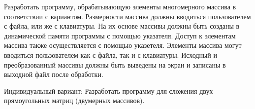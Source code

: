 Разработать программу, обрабатывающую элементы многомерного
массива в соответствии с вариантом.
Размерности массива должны вводиться пользователем с файла, или же
с клавиатуры.
На их основе массивы должны быть созданы в динамической
памяти программы с помощью указателя.
Доступ к элементам массива также осуществляется с помощью указетеля.
Элементы массива могут вводиться пользователем как с файла, так и с
клавиатуры.
Исходный и преобразованный массивы должны быть выведены на экран
и записаны в выходной файл после обработки.

Индивидуальный вариант: Разработать программу для сложения двух 
прямоугольных матриц (двумерных массивов).

\newpage